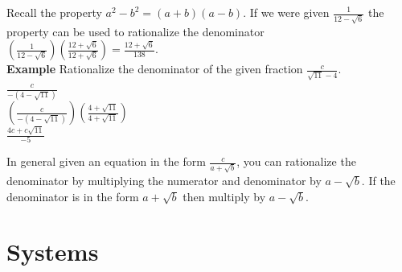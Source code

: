 \documentclass[12pt]{report}
\begin{document}
Recall the property $a^2-b^2=(a+b)(a-b)$. If we were given $\frac{1}{12-\sqrt{6}}$ the property can be used to rationalize the denominator $(\frac{1}{12-\sqrt{6}})(\frac{12+\sqrt{6}}{12+\sqrt{6}})=\frac{12+\sqrt{6}}{138}$.\medskip\\
\textbf{Example} Rationalize the denominator of the given fraction $\frac{c}{\sqrt{11}-4}$.\medskip\\
$\frac{c}{-(4-\sqrt{11})}$\smallskip\\
$(\frac{c}{-(4-\sqrt{11})})(\frac{4+\sqrt{11}}{4+\sqrt{11}})$\smallskip\\
$\frac{4c+c\sqrt{11}}{-5}$\medskip

In general given an equation in the form $\frac{c}{a+\sqrt{b}}$, you can rationalize the denominator by multiplying the numerator and denominator by ${a-\sqrt{b}}$. If the denominator is in the form $a+\sqrt{b}$ then multiply by $a-\sqrt{b}$.

\section{Systems}
\end{document}
